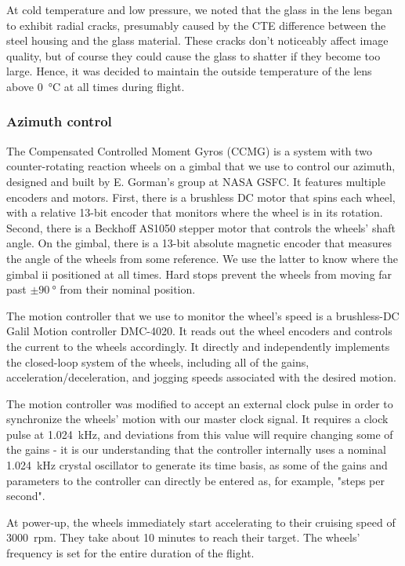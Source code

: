 At cold temperature and low pressure, we noted that the glass in the lens began to exhibit radial cracks, presumably caused by the CTE difference between the steel housing and the glass material. These cracks don't noticeably affect image quality, but of course they could cause the glass to shatter if they become too large. Hence, it was decided to maintain the outside temperature of the lens above \SI{0}{\celsius} at all times during flight.



\subsubsection{Azimuth control}

The Compensated Controlled Moment Gyros (CCMG) is a system with two counter-rotating reaction wheels on a gimbal that we use to control our azimuth, designed and built by E. Gorman's group at NASA GSFC. It features multiple encoders and motors. First, there is a brushless DC motor that spins each wheel, with a relative 13-bit encoder that monitors where the wheel is in its rotation. Second, there is a Beckhoff AS1050 stepper motor that controls the wheels' shaft angle. On the gimbal, there is a 13-bit  absolute magnetic encoder that measures the angle of the wheels from some reference. We use the latter to know where the gimbal ii positioned at all times. Hard stops prevent the wheels from moving far past $\pm\SI{90}{\degree}$ from their nominal position.

The motion controller that we use to monitor the wheel's speed is a brushless-DC Galil Motion controller DMC-4020. It reads out the wheel encoders and controls the current to the wheels accordingly. It directly and independently implements the closed-loop system of the wheels, including all of the gains, acceleration/deceleration, and jogging speeds associated with the desired motion.

The motion controller was modified to accept an external clock pulse in order to synchronize the wheels' motion with our master clock signal. It requires a clock pulse at \SI{1.024}{\kilo\hertz}, and deviations from this value will require changing some of the gains - it is our understanding that the controller internally uses a nominal \SI{1.024}{\kilo\hertz} crystal oscillator to generate its time basis, as some of the gains and parameters to the controller can directly be entered as, for example, "steps per second". 

At power-up, the wheels immediately start accelerating to their cruising speed of \num{3000}~rpm. They take about 10 minutes to reach their target. The wheels' frequency is set for the entire duration of the flight.

